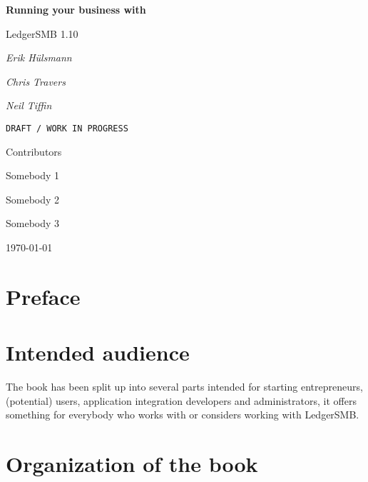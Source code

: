 \documentclass[10pt,a4paper]{book}
\newcommand{\ledgerSMBversion}{1.10 }
\begin{document}
\begin{titlepage}
	\centering
	
	\large{\textbf{Running your business with}} \par
	
	\LARGE LedgerSMB \ledgerSMBversion \par
	\vspace{1cm}
	{\Large\itshape Erik H\"ulsmann\par}
	{\Large\itshape Chris Travers\par}
	{\Large\itshape Neil Tiffin\par}
	\vspace{1cm}
	\texttt{DRAFT / WORK IN PROGRESS} \par	
	\vspace{1cm}	
	{\large Contributors\par}
	{\normalsize Somebody 1\par}
	{\normalsize Somebody 2\par}
	{\normalsize Somebody 3\par}
	\vfill
	
	{\large \today\par}
\end{titlepage}

\tableofcontents

\listoffigures

\listoftables

\printglossaries

\cleardoublepage

\section*{Preface}
\label{preface}

\section*{Intended audience}
\label{sec-intended-audience}

The book has been split up into several parts intended for starting entrepreneurs,
(potential) users, application integration developers and
administrators, it offers something for everybody who works with or considers working with
LedgerSMB.

\section*{Organization of the book}
\label{sec-book-organization}
\end{document}
